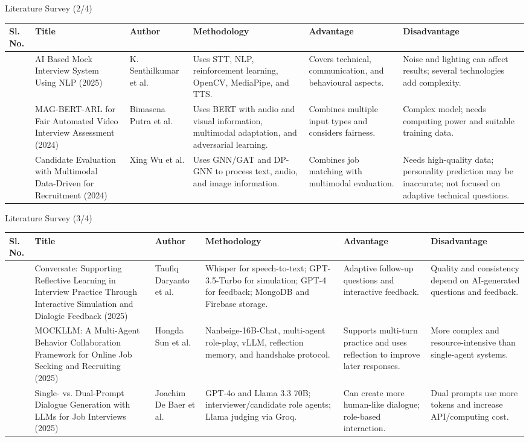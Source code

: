 \documentclass[aspectratio=169,11pt]{beamer}
\newcommand{\litrow}[6]{#1 & #2 & #3 & #4 & #5 & #6\\\hline}
\begin{document}
\begin{frame}{Literature Survey (2/4)}
\scriptsize
\setlength{\tabcolsep}{3pt}
\renewcommand{\arraystretch}{1.15}
\begin{tabularx}{\textwidth}{|>{\centering\arraybackslash}p{}|p{}|p{}|Y|Y|Y|}
\hline
\textbf{Sl. No.} & \textbf{Title} & \textbf{Author} & \textbf{Methodology} & \textbf{Advantage} & \textbf{Disadvantage}\\
\hline
\litrow{4}{AI Based Mock Interview System Using NLP (2025)}{K. Senthilkumar et al.}{Uses STT, NLP, reinforcement learning, OpenCV, MediaPipe, and TTS.}{Covers technical, communication, and behavioural aspects.}{Noise and lighting can affect results; several technologies add complexity.}
\litrow{5}{MAG-BERT-ARL for Fair Automated Video Interview Assessment (2024)}{Bimasena Putra et al.}{Uses BERT with audio and visual information, multimodal adaptation, and adversarial learning.}{Combines multiple input types and considers fairness.}{Complex model; needs computing power and suitable training data.}
\litrow{6}{Candidate Evaluation with Multimodal Data-Driven for Recruitment (2024)}{Xing Wu et al.}{Uses GNN/GAT and DP-GNN to process text, audio, and image information.}{Combines job matching with multimodal evaluation.}{Needs high-quality data; personality prediction may be inaccurate; not focused on adaptive technical questions.}
\end{tabularx}
\end{frame}

\begin{frame}{Literature Survey (3/4)}
\scriptsize
\setlength{\tabcolsep}{3pt}
\renewcommand{\arraystretch}{1.15}
\begin{tabularx}{\textwidth}{|>{\centering\arraybackslash}p{}|p{}|p{}|Y|Y|Y|}
\hline
\textbf{Sl. No.} & \textbf{Title} & \textbf{Author} & \textbf{Methodology} & \textbf{Advantage} & \textbf{Disadvantage}\\
\hline
\litrow{7}{Conversate: Supporting Reflective Learning in Interview Practice Through Interactive Simulation and Dialogic Feedback (2025)}{Taufiq Daryanto et al.}{Whisper for speech-to-text; GPT-3.5-Turbo for simulation; GPT-4 for feedback; MongoDB and Firebase storage.}{Adaptive follow-up questions and interactive feedback.}{Quality and consistency depend on AI-generated questions and feedback.}
\litrow{8}{MOCKLLM: A Multi-Agent Behavior Collaboration Framework for Online Job Seeking and Recruiting (2025)}{Hongda Sun et al.}{Nanbeige-16B-Chat, multi-agent role-play, vLLM, reflection memory, and handshake protocol.}{Supports multi-turn practice and uses reflection to improve later responses.}{More complex and resource-intensive than single-agent systems.}
\litrow{9}{Single- vs. Dual-Prompt Dialogue Generation with LLMs for Job Interviews (2025)}{Joachim De Baer et al.}{GPT-4o and Llama 3.3 70B; interviewer/candidate role agents; Llama judging via Groq.}{Can create more human-like dialogue; role-based interaction.}{Dual prompts use more tokens and increase API/computing cost.}
\end{tabularx}
\end{frame}
\end{document}
